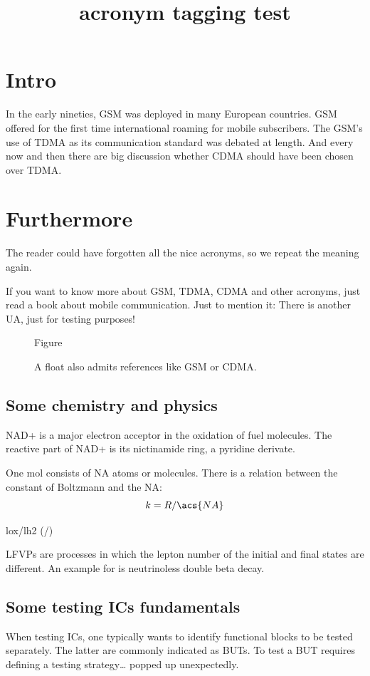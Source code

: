 \documentclass{article}
\title{acronym tagging test}
\begin{document}
\section{Intro}
In the early nineties, \acs{GSM} was deployed in many European
countries. \ac{GSM} offered for the first time international
roaming for mobile subscribers. The \acs{GSM}'s use of \ac{TDMA} as
its communication standard was debated at length. And every now
and then there are big discussion whether \ac{CDMA} should have
been chosen over \ac{TDMA}.

\section{Furthermore}
\acresetall
The reader could have forgotten all the nice acronyms, so we repeat the
meaning again.

If you want to know more about \acf{GSM}, \acf{TDMA}, \acf{CDMA}
and other acronyms, just read a book about mobile communication. Just
to mention it: There is another \ac{UA}, just for testing purposes!

\begin{figure}[h]
Figure
\caption{A float also admits references like \ac{GSM} or \acf{CDMA}.}
\end{figure}

\subsection{Some chemistry and physics}
\label{Chem}
\ac{NAD+} is a major electron acceptor in the oxidation
of fuel molecules. The reactive part of \ac{NAD+} is its nictinamide
ring, a pyridine derivate.

One mol consists of \acs{NA} atoms or molecules. There is a relation
between the constant of Boltzmann and the \acl{NA}:
\begin{equation}
  k = R/\acs{NA}\label{my:eq}
\end{equation}

\acl{lox}/\acl{lh2} (/)

\Acp{LFVP} are processes in which the lepton number of the initial
and final states are different. An example for  is
neutrinoless double beta decay.

\subsection{Some testing \acp{IC} fundamentals}
When testing \acp{IC}, one typically wants to identify functional
blocks to be tested separately. The latter are commonly indicated as
\acp{BUT}. To test a \ac{BUT} requires defining a testing strategy\dots{}
 popped up unexpectedly.
\end{document}
